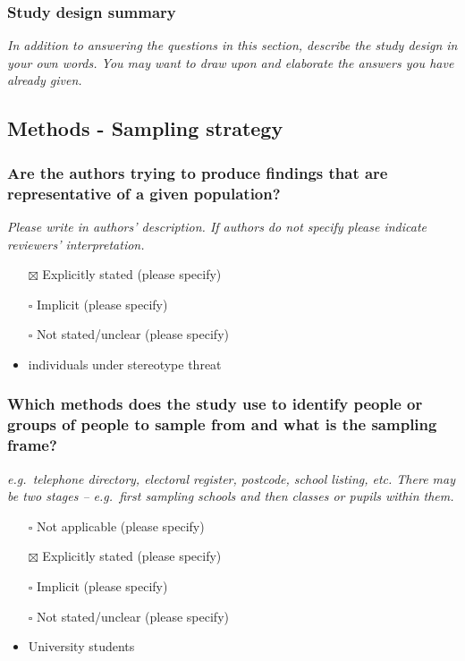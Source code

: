 \documentclass[
  doc, a4paper]{apa7}
\begin{document}
\subsubsection{Study design summary}\label{study-design-summary}

\emph{In addition to answering the questions in this section, describe the study design in your own words. You may want to draw upon and elaborate the answers you have already given.}

\subsection{Methods - Sampling strategy}\label{methods---sampling-strategy}

\subsubsection{Are the authors trying to produce findings that are representative of a given population?}\label{are-the-authors-trying-to-produce-findings-that-are-representative-of-a-given-population}

\emph{Please write in authors' description. If authors do not specify please indicate reviewers' interpretation.}

\begin{itemize}
\item[$\boxtimes$]
  Explicitly stated (please specify)
\item[$\square$]
  Implicit (please specify)
\item[$\square$]
  Not stated/unclear (please specify)
\item
  individuals under stereotype threat
\end{itemize}

\subsubsection{Which methods does the study use to identify people or groups of people to sample from and what is the sampling frame?}\label{which-methods-does-the-study-use-to-identify-people-or-groups-of-people-to-sample-from-and-what-is-the-sampling-frame}

\emph{e.g.~telephone directory, electoral register, postcode, school listing, etc. There may be two stages -- e.g.~first sampling schools and then classes or pupils within them.}

\begin{itemize}
\item[$\square$]
  Not applicable (please specify)
\item[$\boxtimes$]
  Explicitly stated (please specify)
\item[$\square$]
  Implicit (please specify)
\item[$\square$]
  Not stated/unclear (please specify)
\item
  University students
\end{itemize}
\end{document}

